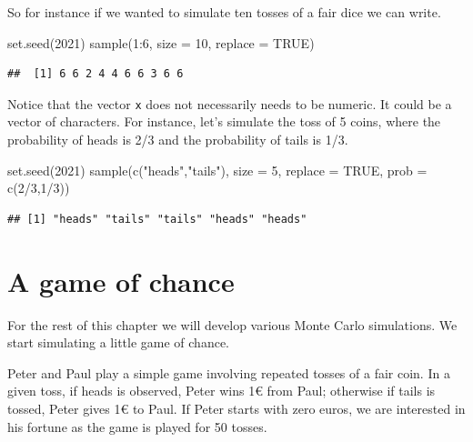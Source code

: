 \documentclass[
]{book}
\newenvironment{Shaded}{\begin{snugshade}}{\end{snugshade}}
\newcommand{\AttributeTok}[1]{\textcolor[rgb]{0.77,0.63,0.00}{#1}}
\newcommand{\ConstantTok}[1]{\textcolor[rgb]{0.00,0.00,0.00}{#1}}
\newcommand{\DecValTok}[1]{\textcolor[rgb]{0.00,0.00,0.81}{#1}}
\newcommand{\FunctionTok}[1]{\textcolor[rgb]{0.00,0.00,0.00}{#1}}
\newcommand{\NormalTok}[1]{#1}
\newcommand{\SpecialCharTok}[1]{\textcolor[rgb]{0.00,0.00,0.00}{#1}}
\newcommand{\StringTok}[1]{\textcolor[rgb]{0.31,0.60,0.02}{#1}}
\begin{document}
So for instance if we wanted to simulate ten tosses of a fair dice we can write.

\begin{Shaded}
\begin{Highlighting}[]
\FunctionTok{set.seed}\NormalTok{(}\DecValTok{2021}\NormalTok{)}
\FunctionTok{sample}\NormalTok{(}\DecValTok{1}\SpecialCharTok{:}\DecValTok{6}\NormalTok{, }\AttributeTok{size =} \DecValTok{10}\NormalTok{, }\AttributeTok{replace =} \ConstantTok{TRUE}\NormalTok{)}
\end{Highlighting}
\end{Shaded}

\begin{verbatim}
##  [1] 6 6 2 4 4 6 6 3 6 6
\end{verbatim}

Notice that the vector \texttt{x} does not necessarily needs to be numeric. It could be a vector of characters. For instance, let's simulate the toss of 5 coins, where the probability of heads is 2/3 and the probability of tails is 1/3.

\begin{Shaded}
\begin{Highlighting}[]
\FunctionTok{set.seed}\NormalTok{(}\DecValTok{2021}\NormalTok{)}
\FunctionTok{sample}\NormalTok{(}\FunctionTok{c}\NormalTok{(}\StringTok{"heads"}\NormalTok{,}\StringTok{"tails"}\NormalTok{), }\AttributeTok{size =} \DecValTok{5}\NormalTok{, }\AttributeTok{replace =} \ConstantTok{TRUE}\NormalTok{, }\AttributeTok{prob =} \FunctionTok{c}\NormalTok{(}\DecValTok{2}\SpecialCharTok{/}\DecValTok{3}\NormalTok{,}\DecValTok{1}\SpecialCharTok{/}\DecValTok{3}\NormalTok{))}
\end{Highlighting}
\end{Shaded}

\begin{verbatim}
## [1] "heads" "tails" "tails" "heads" "heads"
\end{verbatim}

\hypertarget{a-game-of-chance}{%
\section{A game of chance}\label{a-game-of-chance}}

For the rest of this chapter we will develop various Monte Carlo simulations. We start simulating a little game of chance.

Peter and Paul play a simple game involving repeated tosses of a fair coin. In a given toss, if heads is observed, Peter wins 1€ from Paul; otherwise if tails is tossed, Peter gives 1€ to Paul. If Peter starts with zero euros, we are interested in his fortune as the game is played for 50 tosses.
\end{document}
